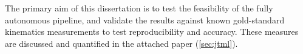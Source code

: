 The primary aim of this dissertation is to test the feasibility of the fully autonomous pipeline, and validate the results against known gold-standard kinematics measurements to test reproducibility and accuracy.
These measures are discussed and quantified in the attached paper (\cref{sec:jtml}).

